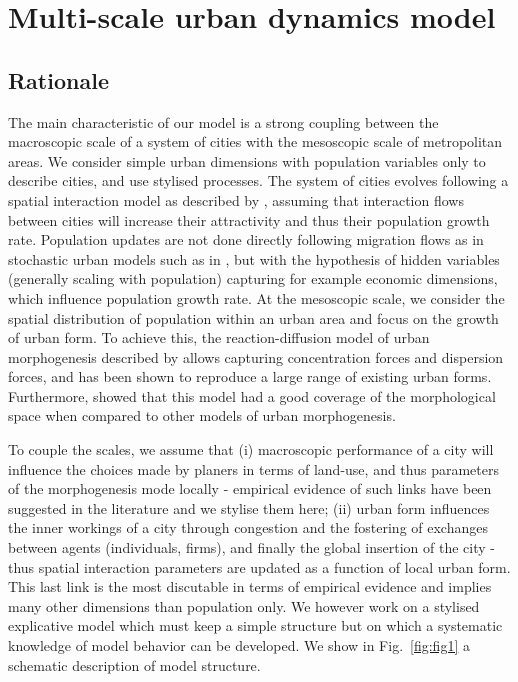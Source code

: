 \documentclass[ijgi,article,submit,moreauthors,pdftex]{Definitions/mdpi}
\begin{document}
\section{Multi-scale urban dynamics model}

\subsection{Rationale}


The main characteristic of our model is a strong coupling between the macroscopic scale of a system of cities with the mesoscopic scale of metropolitan areas. We consider simple urban dimensions with population variables only to describe cities, and use stylised processes. The system of cities evolves following a spatial interaction model as described by \cite{raimbault2020indirect}, assuming that interaction flows between cities will increase their attractivity and thus their population growth rate. Population updates are not done directly following migration flows as in stochastic urban models such as in \cite{james2018zipf}, but with the hypothesis of hidden variables (generally scaling with population) capturing for example economic dimensions, which influence population growth rate. At the mesoscopic scale, we consider the spatial distribution of population within an urban area and focus on the growth of urban form. To achieve this, the reaction-diffusion model of urban morphogenesis described by \cite{raimbault2018calibration} allows capturing concentration forces and dispersion forces, and has been shown to reproduce a large range of existing urban forms. Furthermore, \cite{raimbault2020comparison} showed that this model had a good coverage of the morphological space when compared to other models of urban morphogenesis.

To couple the scales, we assume that (i) macroscopic performance of a city will influence the choices made by planers in terms of land-use, and thus parameters of the morphogenesis mode locally - empirical evidence of such links have been suggested in the literature \cite{joy2015toronto} and we stylise them here; (ii) urban form influences the inner workings of a city through congestion and the fostering of exchanges between agents (individuals, firms), and finally the global insertion of the city - thus spatial interaction parameters are updated as a function of local urban form. This last link is the most discutable in terms of empirical evidence and implies many other dimensions than population only. We however work on a stylised explicative model which must keep a simple structure but on which a systematic knowledge of model behavior can be developed. We show in Fig.~\ref{fig:fig1} a schematic description of model structure.
\end{document}
